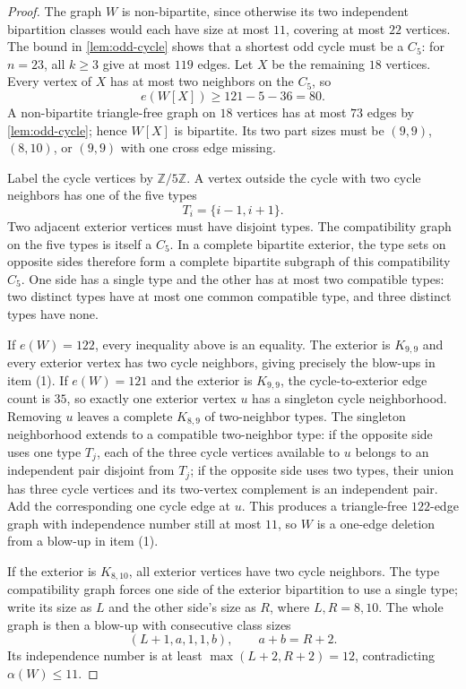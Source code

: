 \begin{proof}
The graph $W$ is non-bipartite, since otherwise its two independent bipartition classes would each have size at most $11$, covering at most $22$ vertices. The bound in \cref{lem:odd-cycle} shows that a shortest odd cycle must be a $C_5$: for $n=23$, all $k\geq3$ give at most $119$ edges. Let $X$ be the remaining $18$ vertices. Every vertex of $X$ has at most two neighbors on the $C_5$, so
\[
e(W[X])\geq121-5-36=80.
\]
A non-bipartite triangle-free graph on $18$ vertices has at most $73$ edges by \cref{lem:odd-cycle}; hence $W[X]$ is bipartite. Its two part sizes must be $(9,9)$, $(8,10)$, or $(9,9)$ with one cross edge missing.

Label the cycle vertices by $\mathbb Z/5\mathbb Z$. A vertex outside the cycle with two cycle neighbors has one of the five types
\[
T_i=\{i-1,i+1\}.
\]
Two adjacent exterior vertices must have disjoint types. The compatibility graph on the five types is itself a $C_5$. In a complete bipartite exterior, the type sets on opposite sides therefore form a complete bipartite subgraph of this compatibility $C_5$. One side has a single type and the other has at most two compatible types: two distinct types have at most one common compatible type, and three distinct types have none.

If $e(W)=122$, every inequality above is an equality. The exterior is $K_{9,9}$ and every exterior vertex has two cycle neighbors, giving precisely the blow-ups in item (1). If $e(W)=121$ and the exterior is $K_{9,9}$, the cycle-to-exterior edge count is $35$, so exactly one exterior vertex $u$ has a singleton cycle neighborhood. Removing $u$ leaves a complete $K_{8,9}$ of two-neighbor types. The singleton neighborhood extends to a compatible two-neighbor type: if the opposite side uses one type $T_j$, each of the three cycle vertices available to $u$ belongs to an independent pair disjoint from $T_j$; if the opposite side uses two types, their union has three cycle vertices and its two-vertex complement is an independent pair. Add the corresponding one cycle edge at $u$. This produces a triangle-free $122$-edge graph with independence number still at most $11$, so $W$ is a one-edge deletion from a blow-up in item (1).

If the exterior is $K_{8,10}$, all exterior vertices have two cycle neighbors. The type compatibility graph forces one side of the exterior bipartition to use a single type; write its size as $L$ and the other side's size as $R$, where ${L,R}={8,10}$. The whole graph is then a blow-up with consecutive class sizes
\[
(L+1,a,1,1,b),\qquad a+b=R+2.
\]
Its independence number is at least $\max(L+2,R+2)=12$, contradicting $\alpha(W)\leq11$.


\end{proof}

